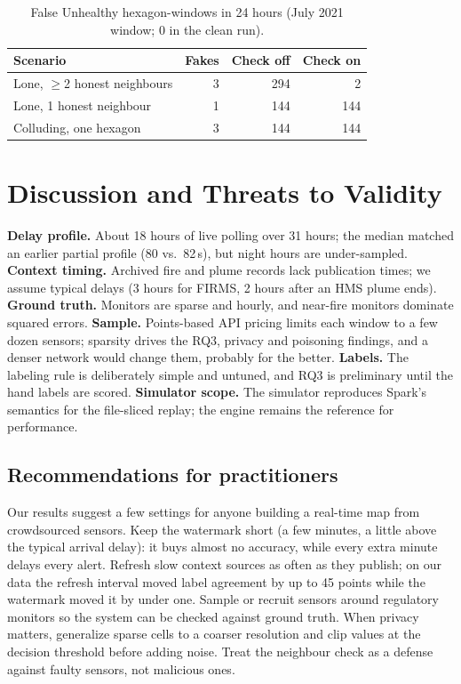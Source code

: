 \documentclass[10pt,journal,compsoc]{IEEEtran}
\begin{document}
\begin{table}[t]
\caption{False Unhealthy hexagon-windows in 24 hours (July 2021 window; 0 in the clean run).}
\label{tab:poison}
\centering\footnotesize
\begin{tabular}{lrrr}
\toprule
Scenario & Fakes & Check off & Check on \\
\midrule
Lone, $\ge$2 honest neighbours & 3 & 294 & 2 \\
Lone, 1 honest neighbour & 1 & 144 & 144 \\
Colluding, one hexagon & 3 & 144 & 144 \\
\bottomrule
\end{tabular}
\end{table}

\section{Discussion and Threats to Validity}
\textbf{Delay profile.} About 18 hours of live polling over 31 hours; the median matched an earlier partial profile (80 vs.\ 82\,s), but night hours are under-sampled. \textbf{Context timing.} Archived fire and plume records lack publication times; we assume typical delays (3 hours for FIRMS, 2 hours after an HMS plume ends). \textbf{Ground truth.} Monitors are sparse and hourly, and near-fire monitors dominate squared errors. \textbf{Sample.} Points-based API pricing limits each window to a few dozen sensors; sparsity drives the RQ3, privacy and poisoning findings, and a denser network would change them, probably for the better. \textbf{Labels.} The labeling rule is deliberately simple and untuned, and RQ3 is preliminary until the hand labels are scored. \textbf{Simulator scope.} The simulator reproduces Spark's semantics for the file-sliced replay; the engine remains the reference for performance.

\subsection*{Recommendations for practitioners}
Our results suggest a few settings for anyone building a real-time map from crowdsourced sensors. Keep the watermark short (a few minutes, a little above the typical arrival delay): it buys almost no accuracy, while every extra minute delays every alert. Refresh slow context sources as often as they publish; on our data the refresh interval moved label agreement by up to 45 points while the watermark moved it by under one. Sample or recruit sensors around regulatory monitors so the system can be checked against ground truth. When privacy matters, generalize sparse cells to a coarser resolution and clip values at the decision threshold before adding noise. Treat the neighbour check as a defense against faulty sensors, not malicious ones.
\end{document}
